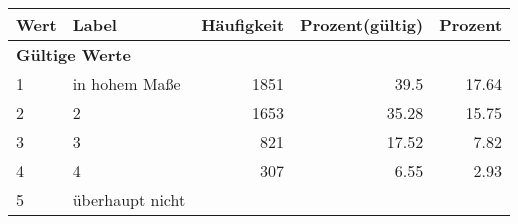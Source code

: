      \begin{longtable}{lXrrr}
     \toprule
     \textbf{Wert} & \textbf{Label} & \textbf{Häufigkeit} & \textbf{Prozent(gültig)} & \textbf{Prozent} \\
     \endhead
     \midrule
     \multicolumn{5}{l}{\textbf{Gültige Werte}}\\

     1 &
     \multicolumn{1}{X}{ in hohem Maße   } &


       \num{1851} &
       \num[round-mode=places,round-precision=2]{39,5} &
         \num[round-mode=places,round-precision=2]{17,64} \\

     2 &
     \multicolumn{1}{X}{ 2   } &


       \num{1653} &
       \num[round-mode=places,round-precision=2]{35,28} &
         \num[round-mode=places,round-precision=2]{15,75} \\

     3 &
     \multicolumn{1}{X}{ 3   } &


       \num{821} &
       \num[round-mode=places,round-precision=2]{17,52} &
         \num[round-mode=places,round-precision=2]{7,82} \\

     4 &
     \multicolumn{1}{X}{ 4   } &


       \num{307} &
       \num[round-mode=places,round-precision=2]{6,55} &
         \num[round-mode=places,round-precision=2]{2,93} \\

     5 &
     \multicolumn{1}{X}{ überhaupt nicht   } &



\end{longtable}
